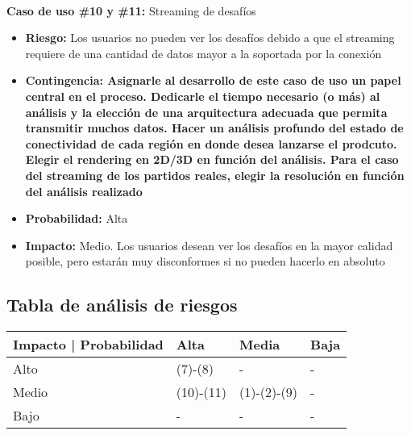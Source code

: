 ~

\textbf{Caso de uso \#10 y \#11:} Streaming de desafíos
\begin{itemize}
\item{\textbf{Riesgo:} Los usuarios no pueden ver los desafíos debido a que el streaming requiere de una cantidad de datos mayor a la soportada por la conexión}
\item{\textbf{Contingencia: Asignarle al desarrollo de este caso de uso un papel central en el proceso. Dedicarle el tiempo necesario (o más) al análisis y la elección 
de una arquitectura adecuada que permita transmitir muchos datos. Hacer un análisis profundo del estado de conectividad de cada región en donde desea lanzarse el prodcuto.
Elegir el rendering en 2D/3D en función del análisis. Para el caso del streaming de los partidos reales, elegir la resolución en función del análisis realizado}} 
\item{\textbf{Probabilidad:} Alta}
\item{\textbf{Impacto:} Medio. Los usuarios desean ver los desafíos en la mayor calidad posible, pero estarán muy disconformes si no pueden hacerlo en absoluto}
\end{itemize}


\subsection{Tabla de análisis de riesgos}

\begin{center}
    \begin{tabular}{ | l | l | l | p{5cm} |}
    \hline
    Impacto | Probabilidad & Alta & Media & Baja \\ \hline
    Alto & (7)-(8) & - & - \\ \hline
    Medio & (10)-(11) & (1)-(2)-(9) & - \\ \hline
    Bajo & - & - & - \\ \hline
    \end{tabular}
\end{center}
